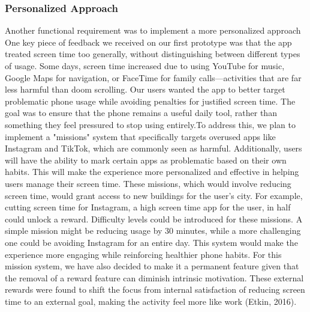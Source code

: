 \documentclass[sigconf, 11pt]{acmart}
\begin{document}
\subsubsection{Personalized Approach}
Another functional requirement was to implement a more personalized approach One key piece of feedback we received on our first prototype was that the app treated screen time too generally, without distinguishing between different types of usage. Some days, screen time increased due to using YouTube for music, Google Maps for navigation, or FaceTime for family calls—activities that are far less harmful than doom scrolling. Our users wanted the app to better target problematic phone usage while avoiding penalties for justified screen time. The goal was to ensure that the phone remains a useful daily tool, rather than something they feel pressured to stop using entirely.To address this, we plan to implement a "missions" system that specifically targets overused apps like Instagram and TikTok, which are commonly seen as harmful. Additionally, users will have the ability to mark certain apps as problematic based on their own habits. This will make the experience more personalized and effective in helping users manage their screen time. These missions, which would involve reducing screen time, would grant access to new buildings for the user's city. For example, cutting screen time for Instagram, a high screen time app for the user, in half could unlock a reward. Difficulty levels could be introduced for these missions. A simple mission might be reducing usage by 30 minutes, while a more challenging one could be avoiding Instagram for an entire day. This system would make the experience more engaging while reinforcing healthier phone habits. For this mission system, we have also decided to make it a permanent feature given that the removal of a reward feature can diminish intrinsic motivation. These external rewards were found to shift the focus from internal satisfaction of reducing screen time to an external goal, making the activity feel more like work (Etkin, 2016).
\\
\end{document}
